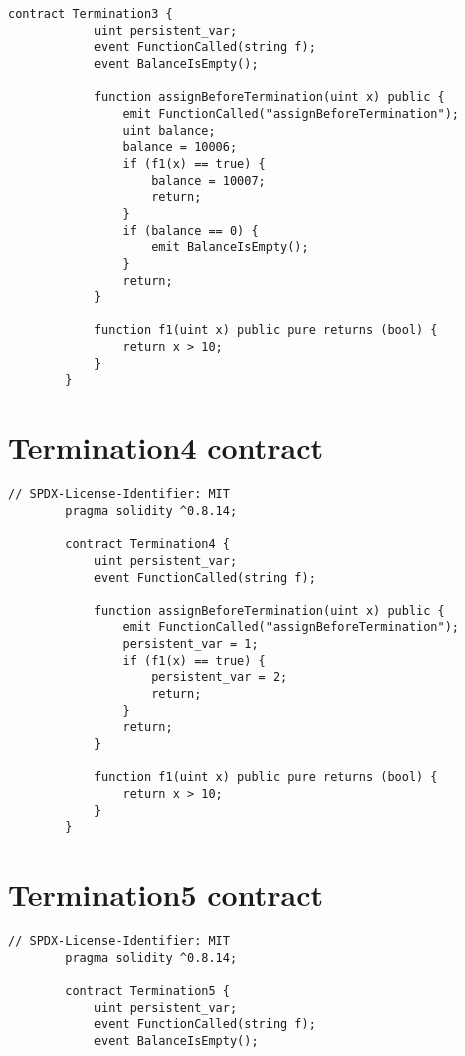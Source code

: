 \documentclass[12pt]{report}
\begin{document}
\begin{appendices}
\begin{lstlisting}[language=Solidity]
        contract Termination3 {
            uint persistent_var;
            event FunctionCalled(string f);
            event BalanceIsEmpty();
        
            function assignBeforeTermination(uint x) public {
                emit FunctionCalled("assignBeforeTermination");
                uint balance;
                balance = 10006;
                if (f1(x) == true) {
                    balance = 10007;
                    return;
                }
                if (balance == 0) {
                    emit BalanceIsEmpty();
                }
                return;
            }
        
            function f1(uint x) public pure returns (bool) {
                return x > 10;
            }
        }                   
    \end{lstlisting}

    \chapter{Termination4 contract}
    \begin{lstlisting}[language=Solidity]
        // SPDX-License-Identifier: MIT
        pragma solidity ^0.8.14;

        contract Termination4 {
            uint persistent_var;
            event FunctionCalled(string f);
        
            function assignBeforeTermination(uint x) public {
                emit FunctionCalled("assignBeforeTermination");
                persistent_var = 1;
                if (f1(x) == true) {
                    persistent_var = 2;
                    return;
                }
                return;
            }
        
            function f1(uint x) public pure returns (bool) {
                return x > 10;
            }
        }                  
    \end{lstlisting}

    \chapter{Termination5 contract}
    \begin{lstlisting}[language=Solidity]
        // SPDX-License-Identifier: MIT
        pragma solidity ^0.8.14;

        contract Termination5 {
            uint persistent_var;
            event FunctionCalled(string f);
            event BalanceIsEmpty();
        

\end{lstlisting}
\end{appendices}
\end{document}

